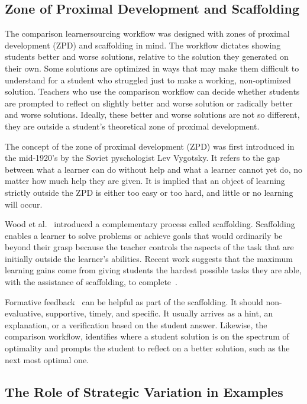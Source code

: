 \subsection{Zone of Proximal Development and Scaffolding}

The comparison learnersourcing workflow was designed with zones of proximal development (ZPD) and scaffolding in mind. The workflow dictates showing students better and worse solutions, relative to the solution they generated on their own. Some solutions are optimized in ways that may make them difficult to understand for a student who struggled just to make a working, non-optimized solution. Teachers who use the comparison workflow can decide whether students are prompted to reflect on slightly better and worse solution or radically better and worse solutions. Ideally, these better and worse solutions are not so different, they are outside a student's theoretical zone of proximal development.

The concept of the zone of proximal development (ZPD) was first introduced in the mid-1920's by the Soviet pyschologist Lev Vygotsky. It refers to the gap between what a learner can do without help and what a learner cannot yet do, no matter how much help they are given. It is implied that an object of learning strictly outside the ZPD is either too easy or too hard, and little or no learning will occur.

Wood et al.~\cite{woodscaffolding} introduced a complementary process called scaffolding. Scaffolding enables a learner to solve problems or achieve goals that would ordinarily be beyond their grasp because the teacher controls the aspects of the task that are initially outside the learner's abilities. Recent work suggests that the maximum learning gains come from giving students the hardest possible tasks they are able, with the assistance of scaffolding, to complete~\cite{zpd14}. 

Formative feedback~\cite{formative} can be helpful as part of the scaffolding. It should non-evaluative, supportive, timely, and specific. It usually arrives as a hint, an explanation, or a verification based on the student answer. Likewise, the comparison workflow, identifies where a student solution is on the spectrum of optimality and prompts the student to reflect on a better solution, such as the next most optimal one.

\subsection{The Role of Strategic Variation in Examples}

